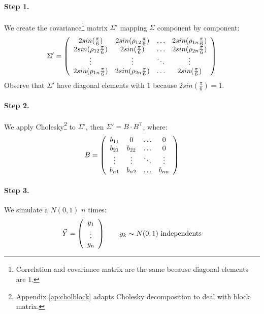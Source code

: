 \documentclass[a4paper,12pt,final]{article}
\begin{document}
\paragraph{Step 1.} We create the covariance\footnote{Correlation and covariance 
matrix are the same because diagonal elements are $1$.} matrix $\Sigma'$ mapping 
$\Sigma$ component by component:
\begin{displaymath}
\Sigma' = \left( 
\begin{array}{cccc}
2 sin(\frac{\pi}{6})           & 2 sin(\rho_{12} \frac{\pi}{6}) & \ldots & 2 sin(\rho_{1n} \frac{\pi}{6})\cr
2 sin(\rho_{12} \frac{\pi}{6}) & 2 sin(\frac{\pi}{6})           & \ldots & 2 sin(\rho_{2n} \frac{\pi}{6})\cr
\vdots                         & \vdots                         & \ddots  & \vdots   \cr
2 sin(\rho_{1n} \frac{\pi}{6}) & 2 sin(\rho_{2n} \frac{\pi}{6}) & \ldots & 2 sin(\frac{\pi}{6})
\end{array}
\right)
\end{displaymath}
Observe that $\Sigma'$ have diagonal elements with $1$ because $2 sin(\frac{\pi}{6}) = 1$.

\paragraph{Step 2.} We apply Cholesky\footnote{Appendix \ref{ap:cholblock} adapts Cholesky 
decomposition to deal with block matrix.} to $\Sigma'$, then $\Sigma' = B \cdot B^{\top}$, 
where:
\begin{displaymath}
B = 
\left(
\begin{array}{cccc}
b_{11}   & 0        & \ldots & 0       \cr
b_{21}   & b_{22}   & \ldots & 0       \cr
\vdots  & \vdots  & \ddots & \vdots \cr
b_{n1}   & b_{n2}   & \ldots & b_{nn}
\end{array}
\right)
\end{displaymath}

\paragraph{Step 3.} We simulate a $N(0,1)$ $n$ times:
\begin{displaymath}
\vec{Y} =
\left(
\begin{array}{c}
y_1 \cr
\vdots \cr
y_n
\end{array}
\right) 
\qquad y_k \sim N(0,1) \textrm{ independents}
\end{displaymath}
\end{document}
